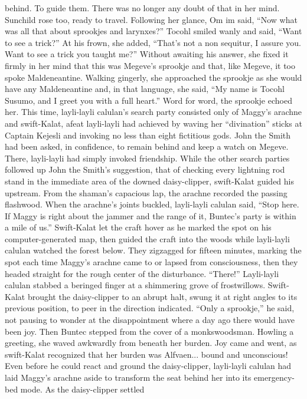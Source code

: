 \documentclass[9pt]{article}
\begin{document}
behind. To guide them. There was no longer any doubt of that in her mind. Sunchild rose too, ready to
travel.
Following her glance, Om im said, “Now what was all that about sprookjes and larynxes?”
Tocohl smiled wanly and said, “Want to see a trick?” At his frown, she added, “That’s not a non
sequitur, I assure you. Want to see a trick you taught me?”
Without awaiting his answer, she fixed it firmly in her mind that this was Megeve’s sprookje and that,
like Megeve, it too spoke Maldeneantine. Walking gingerly, she approached the sprookje as she would
have any Maldeneantine and, in that language, she said, “My name is Tocohl Susumo, and I greet you
with a full heart.”
Word for word, the sprookje echoed her.
This time, layli-layli calulan’s search party consisted only of Maggy’s arachne and swift-Kalat, afeat layli-layli had achieved by waving her “divination” sticks at Captain Kejesli and invoking no less
than eight fictitious gods. John the Smith had been asked, in confidence, to remain behind and keep a
watch on Megeve. There, layli-layli had simply invoked friendship.
While the other search parties followed up John the Smith’s suggestion, that of checking every
lightning rod stand in the immediate area of the downed daisy-clipper, swift-Kalat guided his upstream.
From the shaman’s capacious lap, the arachne recorded the passing flashwood.
When the arachne’s joints buckled, layli-layli calulan said, “Stop here. If Maggy is right about the
jammer and the range of it, Buntec’s party is within a mile of us.”
Swift-Kalat let the craft hover as he marked the spot on his computer-generated map, then guided
the craft into the woods while layli-layli calulan watched the forest below.
They zigzagged for fifteen minutes, marking the spot each time Maggy’s arachne came to or lapsed
from consciousness, then they headed straight for the rough center of the disturbance.
“There!” Layli-layli calulan stabbed a beringed finger at a shimmering grove of frostwillows.
Swift-Kalat brought the daisy-clipper to an abrupt halt, swung it at right angles to its previous
position, to peer in the direction indicated. “Only a sprookje,” he said, not pausing to wonder at the
disappointment where a day ago there would have been joy.
Then Buntec stepped from the cover of a monkswoodsman. Howling a greeting, she waved
awkwardly from beneath her burden. Joy came and went, as swift-Kalat recognized that her burden was
Alfvaen... bound and unconscious!
Even before he could react and ground the daisy-clipper, layli-layli calulan had laid Maggy’s
arachne aside to transform the seat behind her into its emergency-bed mode. As the daisy-clipper settled
\end{document}

